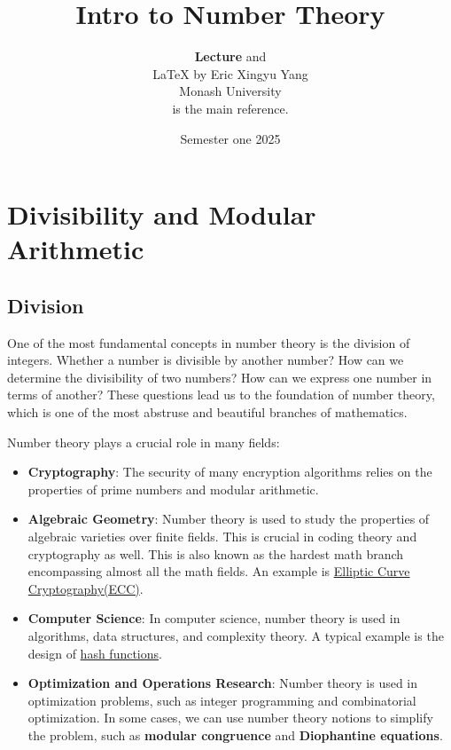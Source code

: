 \documentclass[oneside]{book}
\def\notetitle{Intro to Number Theory}
\def\noteauthor{
    \textbf{Lecture} and\\ 
    {\LaTeX} by Eric Xingyu Yang\\
    Monash University\\
	\textcite{rosenDiscreteMathematicsIts2018} is the main reference.
	}
\def\notedate{Semester one 2025}
\begin{document}
\title{\textbf{
		\LARGE{\notetitle} \vspace*{10\baselineskip}}
}
\author{\noteauthor}
\date{\notedate}

\maketitle
\newpage

\tableofcontents
\newpage


\chapter{Divisibility and Modular Arithmetic}
\section{Division}
One of the most fundamental concepts in number theory is the division of integers.
Whether a number is divisible by another number? How can we determine the
divisibility of two numbers? How can we express one number in terms of another?
These questions lead us to the foundation of number theory, which is one of the most
abstruse and beautiful branches of mathematics.

Number theory plays a crucial role in many fields:
\begin{itemize}
	\item \textbf{Cryptography}: The security of many encryption algorithms relies on the properties of prime numbers and modular arithmetic.
	\item \textbf{Algebraic Geometry}: Number theory is used to study the properties of algebraic varieties over finite fields. This is
	      crucial in coding theory and cryptography as well. This is also known as the hardest math branch encompassing almost all the math fields.
	      An example is
	      \href{https://cryptobook.nakov.com/asymmetric-key-ciphers/elliptic-curve-cryptography-ecc}{Elliptic Curve Cryptography(ECC)}.
	\item \textbf{Computer Science}: In computer science, number theory is used in algorithms, data structures, and complexity theory.
	      A typical example is the design of \href{https://en.wikipedia.org/wiki/Hash_function}{hash functions}.
	\item \textbf{Optimization and Operations Research}: Number theory is used in optimization problems, such as integer programming and combinatorial optimization.
	      In some cases, we can use number theory notions to simplify the problem, such as \textbf{modular congruence} and \textbf{Diophantine equations}.
\end{itemize}
\end{document}
